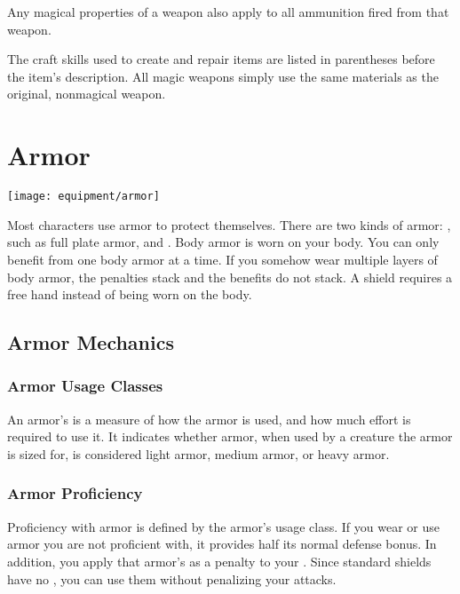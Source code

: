      Any magical properties of a  weapon also apply to all ammunition fired from that weapon.

     The craft skills used to create and repair items are listed in parentheses before the item's description.
    All magic weapons simply use the same materials as the original, nonmagical weapon.

    

    

\newpage
\section{Armor}\label{Armor}
    \texttt{[image: equipment/armor]}

    Most characters use armor to protect themselves. There are two kinds of armor: , such as full plate armor, and .
    Body armor is worn on your body.
    You can only benefit from one body armor at a time.
    If you somehow wear multiple layers of body armor, the penalties stack and the benefits do not stack.
    A shield requires a free hand instead of being worn on the body.

    \subsection{Armor Mechanics}

        \subsubsection{Armor Usage Classes}\label{Armor Usage Classes}
            An armor's  is a measure of how the armor is used, and how much effort is required to use it.
            It indicates whether armor, when used by a creature the armor is sized for, is considered light armor, medium armor, or heavy armor.

        \subsubsection{Armor Proficiency}\label{Armor Proficiency}
            Proficiency with armor is defined by the armor's usage class.
            If you wear or use armor you are not proficient with, it provides half its normal defense bonus.
            In addition, you apply that armor's  as a penalty to your .
            Since standard shields have no , you can use them without penalizing your attacks.

